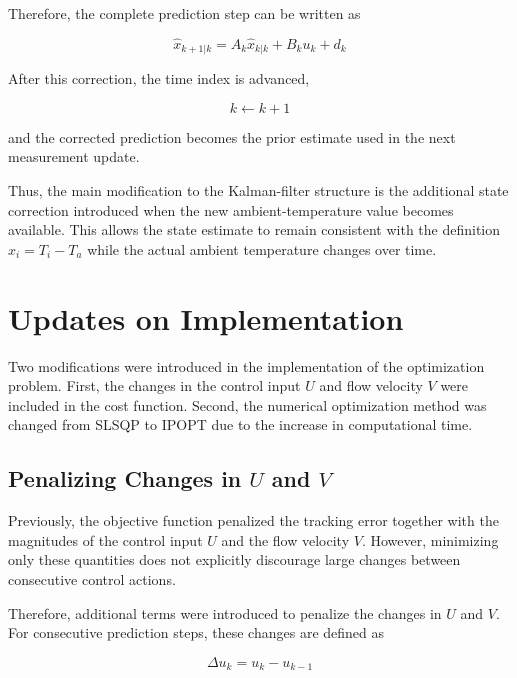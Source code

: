 Therefore, the complete prediction step can be written as

\begin{equation}
    \boxed{
    \hat{x}_{k+1|k}
    =
    A_k\hat{x}_{k|k}
    +
    B_ku_k
    +
    d_k
    }
\end{equation}

After this correction, the time index is advanced,

\begin{equation}
    k \leftarrow k+1
\end{equation}

and the corrected prediction becomes the prior estimate used in the next
measurement update.

Thus, the main modification to the Kalman-filter structure is the additional
state correction introduced when the new ambient-temperature value becomes
available. This allows the state estimate to remain consistent with the
definition \(x_i=T_i-T_a\) while the actual ambient temperature changes over
time.

\section{Updates on Implementation}
\label{sec:district_heating_implementation_updates}

Two modifications were introduced in the implementation of the optimization
problem. First, the changes in the control input \(U\) and flow velocity
\(V\) were included in the cost function. Second, the numerical optimization
method was changed from SLSQP to IPOPT due to the increase in computational
time.

\subsection{Penalizing Changes in \(U\) and \(V\)}

Previously, the objective function penalized the tracking error together with
the magnitudes of the control input \(U\) and the flow velocity \(V\).
However, minimizing only these quantities does not explicitly discourage
large changes between consecutive control actions.

Therefore, additional terms were introduced to penalize the changes in
\(U\) and \(V\). For consecutive prediction steps, these changes are defined
as

\begin{equation}
    \Delta u_k
    =
    u_k-u_{k-1}
\end{equation}

